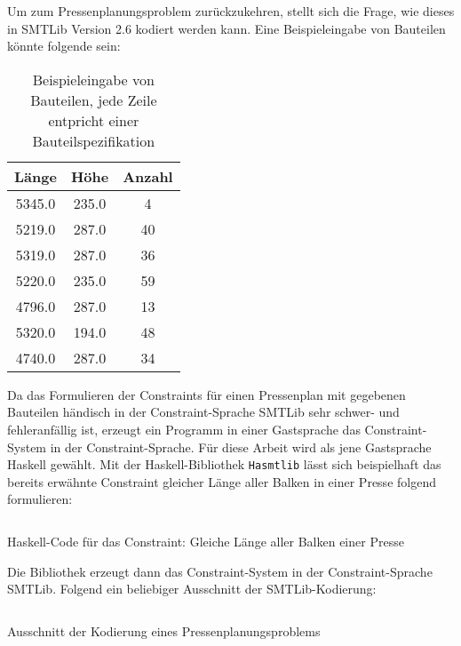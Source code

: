 Um zum Pressenplanungsproblem zurückzukehren, stellt sich die Frage, wie dieses in SMTLib Version 2.6 kodiert werden kann.
Eine Beispieleingabe von Bauteilen könnte folgende sein:

\begin{table}[H]
    \centering
    \begin{tabular}{|c|c|c|}
        \hline
        \textbf{Länge} & \textbf{Höhe} & \textbf{Anzahl} \\
        \hline
        5345.0 & 235.0 & 4 \\
        5219.0 & 287.0 & 40 \\
        5319.0 & 287.0 & 36 \\
        5220.0 & 235.0 & 59 \\
        4796.0 & 287.0 & 13 \\
        5320.0 & 194.0 & 48 \\
        4740.0 & 287.0 & 34 \\
        \hline
    \end{tabular}
    \caption{Beispieleingabe von Bauteilen, jede Zeile entpricht einer Bauteilspezifikation}
    \label{table:bauteileingabe}
\end{table}

Da das Formulieren der Constraints für einen Pressenplan mit gegebenen Bauteilen händisch in der Constraint-Sprache SMTLib sehr schwer- und fehleranfällig ist,
erzeugt ein Programm in einer Gastsprache das Constraint-System in der Constraint-Sprache.
Für diese Arbeit wird als jene Gastsprache Haskell \cite{haskellhistory} gewählt.
Mit der Haskell-Bibliothek \texttt{Hasmtlib} \cite{hasmtlib} lässt sich beispielhaft das bereits erwähnte Constraint gleicher Länge aller Balken in einer Presse folgend formulieren:

\begin{listing}[H]
    \inputminted{haskell}{Code/Einleitung/PressenlängeConstraintHaskell.hs}
    \caption{Haskell-Code für das Constraint: Gleiche Länge aller Balken einer Presse}
    \label{listing:barLengthCode}
\end{listing}

Die Bibliothek erzeugt dann das Constraint-System in der Constraint-Sprache SMTLib.
Folgend ein beliebiger Ausschnitt der SMTLib-Kodierung:

\begin{listing}[H]
    \inputminted{bash}{Code/Einleitung/PressenlängeConstraintSMTLib.smt2}
    \caption{Ausschnitt der Kodierung eines Pressenplanungsproblems}
    \label{listing:barLengthSMTlib}
\end{listing}

